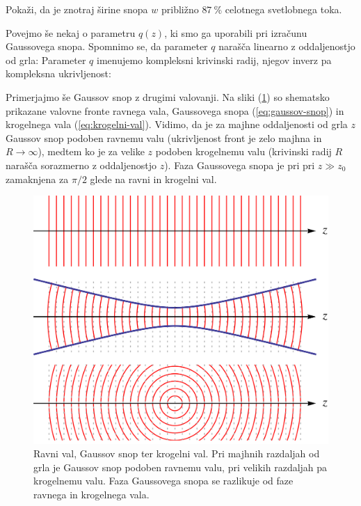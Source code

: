 \begin{definition}
\label{naloga-širina-snopa}
Pokaži, da je znotraj širine snopa $w$ približno $87~\%$ celotnega svetlobnega toka.
\end{definition}

Povejmo še nekaj o parametru $q(z)$, ki smo ga uporabili pri izračunu Gaussovega snopa. Spom\-nimo 
se, da parameter $q$ narašča linearno z oddaljenostjo od grla:
Parameter $q$ imenujemo kompleksni krivinski radij, 
njegov inverz pa kompleksna ukrivljenost: 

Primerjajmo še Gaussov snop z drugimi valovanji. Na sliki (\ref{fig:ravni-Gaussov-krogelni-val}) 
so shematsko prikazane valovne fronte ravnega vala, Gaussovega snopa (\ref{eq:gaussov-snop}) in krogelnega
vala (\ref{eq:krogelni-val}). Vidimo, da je za majhne oddaljenosti od grla $z$ Gaussov
snop podoben ravnemu valu (ukrivljenost front je zelo majhna in $R \to \infty$), 
medtem ko je za velike $z$ podoben krogelnemu valu (krivinski radij $R$ narašča sorazmerno z oddaljenostjo $z$). 
Faza Gaussovega snopa je pri pri $z\gg z_{0}$ zamaknjena za $\pi/2$ glede na ravni in 
krogelni val. 

\begin{figure}[h]
\centering
\includegraphics[width=10truecm]{slike/03_fronte.png}
\caption{Ravni val, Gaussov snop ter
krogelni val. Pri majhnih razdaljah od grla je Gaussov snop podoben
ravnemu valu, pri velikih razdaljah pa krogelnemu valu. Faza Gaussovega snopa
se razlikuje od faze ravnega in krogelnega vala.}
\label{fig:ravni-Gaussov-krogelni-val}
\end{figure}

